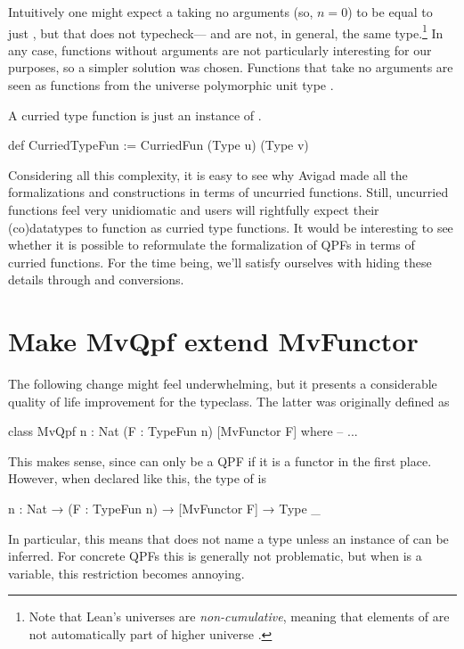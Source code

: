 Intuitively one might expect a  taking no arguments (so, $n = 0$) to be equal to just , but that does not typecheck--- and  are not, in general, the same type.\footnote{Note that Lean's universes are \emph{non-cumulative}, meaning that elements of  are not automatically part of higher universe .}
In any case, functions without arguments are not particularly interesting for our purposes, so a simpler solution was chosen. 
Functions that take no arguments are seen as functions from the universe polymorphic unit type .

A curried type function is just an instance of .
\begin{leancode}
  def CurriedTypeFun := CurriedFun (Type u) (Type v)
\end{leancode}



Considering all this complexity, it is easy to see why Avigad \etal{} made all the formalizations and
constructions in terms of uncurried functions. 
Still, uncurried functions feel very unidiomatic and users will rightfully expect their (co)datatypes
to function as curried type functions. 
It would be interesting to see whether it is possible to reformulate the formalization of QPFs in
terms of curried functions. 
For the time being, we'll satisfy ourselves with hiding these details through
 and  conversions.



\section{Make MvQpf extend MvFunctor}
The following change might feel underwhelming, but it presents a considerable quality 
of life improvement for the  typeclass. The latter was originally defined as
\begin{leancode}
    class MvQpf {n : Nat} (F : TypeFun n) [MvFunctor F] where
        -- ...
\end{leancode}
This makes sense, since  can only be a QPF if it is a functor in the first place.
However, when declared like this, the type of  is 

\begin{leancode}
    {n : Nat} → (F : TypeFun n) → [MvFunctor F] → Type _
\end{leancode}
In particular, this means that  does not name a type unless an instance of  can be inferred. For concrete QPFs this is generally not problematic, but when  is a variable, this restriction becomes annoying. 

